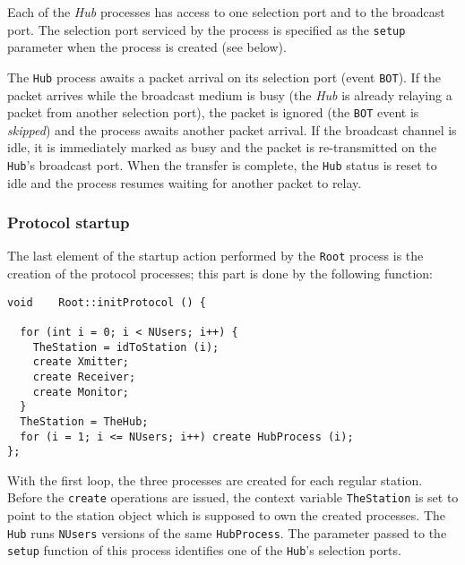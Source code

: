 Each of the {\em Hub\/} processes has access to one selection port
and to the broadcast port.
The selection port serviced by the process is specified
as the {\tt setup} parameter when the process is created (see below).

The {\tt Hub} process awaits a packet arrival on its
selection port (event {\tt BOT}).
If the packet arrives while the broadcast medium is busy (the {\em Hub} is
already relaying a packet from another selection port), the packet
is ignored (the {\tt BOT} event is {\em skipped\/}) and the process
awaits another packet arrival.
If the broadcast channel is idle, it is immediately marked as busy and the
packet is re-transmitted on the {\tt Hub}'s broadcast port.
When the transfer is complete, the {\tt Hub} status is reset to idle and the
process resumes waiting for another packet to relay.

\subsubsection{Protocol startup}

The last element of the startup action performed by the
{\tt Root} process is the creation of the protocol processes;
this part is done by the following function:
{\small
\begin{verbatim}
void    Root::initProtocol () {

  for (int i = 0; i < NUsers; i++) {
    TheStation = idToStation (i);
    create Xmitter;
    create Receiver;
    create Monitor;
  }
  TheStation = TheHub;
  for (i = 1; i <= NUsers; i++) create HubProcess (i);
};
\end{verbatim} }

With the first loop, the three processes are created for each regular station.
Before the {\tt create} operations are issued, the context variable
{\tt TheStation} is set to point to the station object which is supposed to
own the created processes.
The {\tt Hub} runs {\tt NUsers} versions of the same {\tt HubProcess}.
The parameter passed to the {\tt setup} function of this process identifies
one of the {\tt Hub}'s selection ports.
